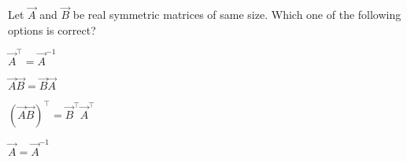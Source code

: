 \item
Let $\vec{A}$ and $\vec{B}$ be real symmetric matrices of same size. Which one of the following options is correct?
\hfill{}
\begin{enumerate}
\begin{multicols}{4}
\item $\vec{A}^{\top} = \vec{A}^{-1}$
\item $\vec{A}\vec{B} = \vec{B}\vec{A}$
\item $(\vec{A}\vec{B})^{\top} = \vec{B}^{\top} \vec{A}^{\top}$
\item $\vec{A} = \vec{A}^{-1}$
\end{multicols}
\end{enumerate}
